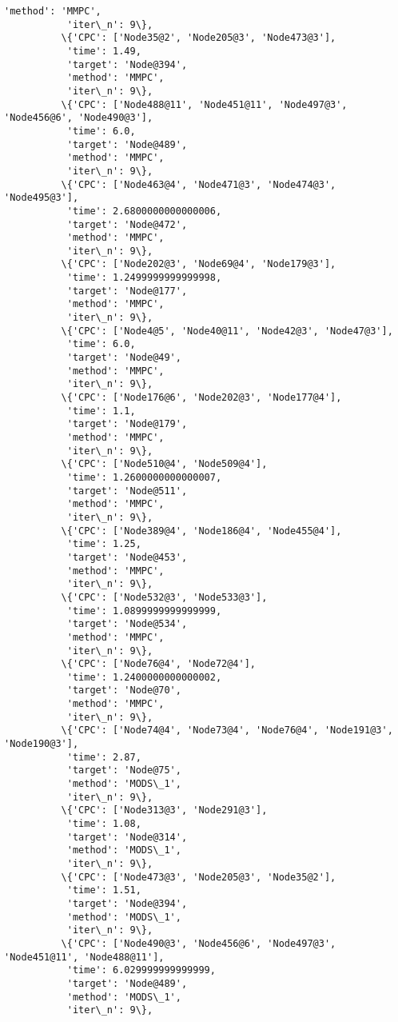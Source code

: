 \documentclass[11pt]{article}
\begin{document}
\begin{Verbatim}[commandchars=\\\{\}]
           'method': 'MMPC',
           'iter\_n': 9\},
          \{'CPC': ['Node35@2', 'Node205@3', 'Node473@3'],
           'time': 1.49,
           'target': 'Node@394',
           'method': 'MMPC',
           'iter\_n': 9\},
          \{'CPC': ['Node488@11', 'Node451@11', 'Node497@3', 'Node456@6', 'Node490@3'],
           'time': 6.0,
           'target': 'Node@489',
           'method': 'MMPC',
           'iter\_n': 9\},
          \{'CPC': ['Node463@4', 'Node471@3', 'Node474@3', 'Node495@3'],
           'time': 2.6800000000000006,
           'target': 'Node@472',
           'method': 'MMPC',
           'iter\_n': 9\},
          \{'CPC': ['Node202@3', 'Node69@4', 'Node179@3'],
           'time': 1.2499999999999998,
           'target': 'Node@177',
           'method': 'MMPC',
           'iter\_n': 9\},
          \{'CPC': ['Node4@5', 'Node40@11', 'Node42@3', 'Node47@3'],
           'time': 6.0,
           'target': 'Node@49',
           'method': 'MMPC',
           'iter\_n': 9\},
          \{'CPC': ['Node176@6', 'Node202@3', 'Node177@4'],
           'time': 1.1,
           'target': 'Node@179',
           'method': 'MMPC',
           'iter\_n': 9\},
          \{'CPC': ['Node510@4', 'Node509@4'],
           'time': 1.2600000000000007,
           'target': 'Node@511',
           'method': 'MMPC',
           'iter\_n': 9\},
          \{'CPC': ['Node389@4', 'Node186@4', 'Node455@4'],
           'time': 1.25,
           'target': 'Node@453',
           'method': 'MMPC',
           'iter\_n': 9\},
          \{'CPC': ['Node532@3', 'Node533@3'],
           'time': 1.0899999999999999,
           'target': 'Node@534',
           'method': 'MMPC',
           'iter\_n': 9\},
          \{'CPC': ['Node76@4', 'Node72@4'],
           'time': 1.2400000000000002,
           'target': 'Node@70',
           'method': 'MMPC',
           'iter\_n': 9\},
          \{'CPC': ['Node74@4', 'Node73@4', 'Node76@4', 'Node191@3', 'Node190@3'],
           'time': 2.87,
           'target': 'Node@75',
           'method': 'MODS\_1',
           'iter\_n': 9\},
          \{'CPC': ['Node313@3', 'Node291@3'],
           'time': 1.08,
           'target': 'Node@314',
           'method': 'MODS\_1',
           'iter\_n': 9\},
          \{'CPC': ['Node473@3', 'Node205@3', 'Node35@2'],
           'time': 1.51,
           'target': 'Node@394',
           'method': 'MODS\_1',
           'iter\_n': 9\},
          \{'CPC': ['Node490@3', 'Node456@6', 'Node497@3', 'Node451@11', 'Node488@11'],
           'time': 6.029999999999999,
           'target': 'Node@489',
           'method': 'MODS\_1',
           'iter\_n': 9\},

\end{Verbatim}
\end{document}
